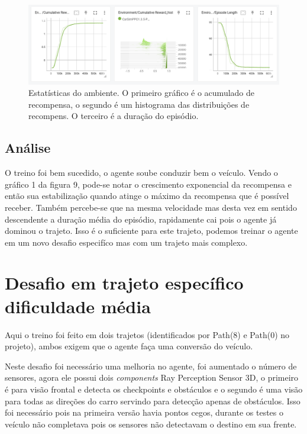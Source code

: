 \begin{figure}[h]
    \centering
    \includegraphics[scale=0.35]{figs/treinos/treino-1/ambiente.png}
     \caption{Estatísticas do ambiente. O primeiro gráfico é o acumulado de recompensa, o segundo é um histograma das distribuições de recompens. O terceiro é a duração do episódio.}
     \label{fig:treino-1-ambiente}
\end{figure}

\subsection*{Análise}
O treino foi bem sucedido, o agente soube conduzir bem o veículo. Vendo o gráfico 1 da figura 9, pode-se notar o crescimento exponencial da recompensa e então sua estabilização quando atinge o máximo da recompensa que é possível receber. Também percebe-se que na mesma velocidade mas desta vez em sentido descendente a duração média do episódio, rapidamente cai pois o agente já dominou o trajeto. Isso é o suficiente para este trajeto, podemos treinar o agente em um novo desafio especifíco mas com um trajeto mais complexo.


\section{Desafio em trajeto específico dificuldade média}
Aqui o treino foi feito em dois trajetos (identificados por Path(8) e Path(0) no projeto), ambos exigem que o agente faça uma conversão do veículo.

Neste desafio foi necessário uma melhoria no agente, foi aumentado o número de sensores, agora ele possui dois \textit{components} Ray Perception Sensor 3D, o primeiro é para visão frontal e detecta os checkpoints e obstáculos e o segundo é uma visão para todas as direções do carro servindo para detecção apenas de obstáculos. Isso foi necessário pois na primeira versão havia pontos cegos, durante os testes o veículo não completava pois os sensores não detectavam o destino em sua frente.



